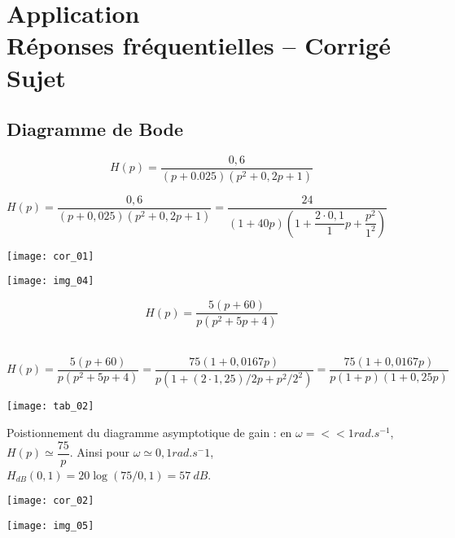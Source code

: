 \chapter*{Application  \\ 
Réponses fréquentielles -- \ifprof Corrigé \else Sujet \fi}
\iflivret {} \else
\ifprof  {} \else \fi
\fi
\setcounter{question}{0}



\section*{Diagramme de Bode}
$$
H(p)=\dfrac{0,6}{(p+0.025)(p^2+0,2p+1)}
$$

\ifprof
\begin{corrige}
$H(p)=\dfrac{0,6}{(p+0,025)(p^2+0,2p+1)}=\dfrac{24}{(1+40p)\left(1+\dfrac{2\cdot 0,1}{1} p+\dfrac{p^2}{1^2}\right)}$
\end{corrige}
\begin{center}
\texttt{[image: cor\_01]}
\end{center}

\else
\begin{center}
\texttt{[image: img\_04]}
\end{center}
\fi

{}
$$
H(p)=\dfrac{5(p+60)}{p(p^2+5p+4)}
$$


\ifprof
\begin{corrige} ~\\

$H(p)=\dfrac{5(p+60)}{p(p^2+5p+4)} =\dfrac{75(1+0,0167p)}{p(1+(2\cdot 1,25)/2 p+p^2/2^2 )} =\dfrac{75(1+0,0167p)}{p(1+p)(1+0,25p)}
$

\begin{center}
\texttt{[image: tab\_02]}
\end{center}

Poistionnement du diagramme asymptotique de gain : en $\omega=<< 1\si{rad.s^{-1}}$, 
$H(p)\simeq \dfrac{75}{p}$. Ainsi pour $\omega\simeq 0,1\si{rad.s^-1}$, $H_{dB}(0,1)=20\log(75/0,1)=\SI{57}{dB}$.

\end{corrige}
\begin{center}
\texttt{[image: cor\_02]}
\end{center}
\else
\begin{center}
\texttt{[image: img\_05]}
\end{center}\fi



